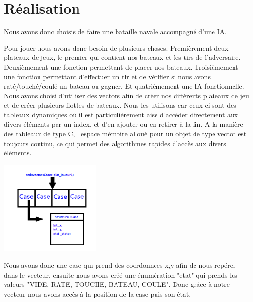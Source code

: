 \documentclass[a4paper,oneside]{article}
\begin{document}
\clearpage



\section{Réalisation}

Nous avons donc choisis de faire une bataille navale accompagné d'une IA.

Pour jouer nous avons donc besoin de plusieurs choses.  Premièrement deux plateaux de jeux, le premier qui contient  nos bateaux et les tirs de l'adversaire. Deuxièmement une fonction permettant de placer nos bateaux. Troisièmement une fonction permettant d'effectuer un tir et de vérifier si nous avons raté/touché/coulé un bateau ou gagner. Et quatrièmement une IA fonctionnelle.
\newline
\\

Nous avons choisi d'utiliser des vectors afin de créer nos différents plateaux de jeu et de créer plusieurs flottes de bateaux. 
Nous les utilisons car ceux-ci sont des tableaux dynamiques où il est particulièrement aisé d’accéder directement aux divers éléments par un index, et d’en ajouter ou en retirer à la fin.
A la manière des tableaux de type C, l’espace mémoire alloué pour un objet de type
vector est toujours continu, ce qui permet des algorithmes rapides d’accès aux divers éléments.

\begin{center}
	\includegraphics[width=5cm]{VectorCase.png} 
\end{center} 


Nous avons donc une case qui prend des coordonnées x,y afin de nous repérer dans le vecteur, ensuite nous avons créé une énumération "etat" qui prends les valeurs "VIDE, RATE, TOUCHE, BATEAU, COULE".  
Donc grâce à notre vecteur nous avons accès à la position de la case puis son état.
\newline
\\
\end{document}
